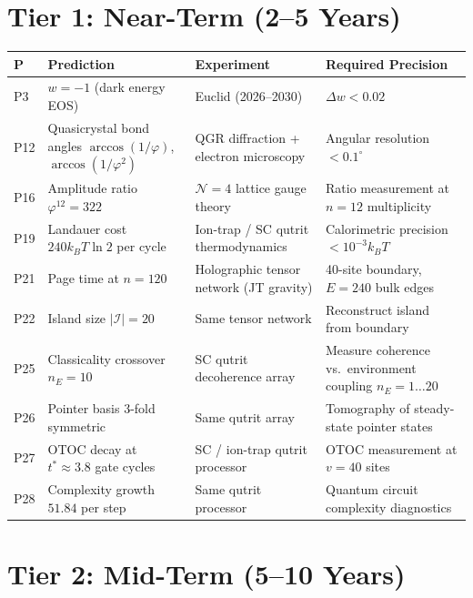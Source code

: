 \section{Tier 1: Near-Term (2--5 Years)}
\label{sec:tier1}

\begin{longtable}{p{0.5cm}p{3.5cm}p{3cm}p{4cm}}
  \hline
  \textbf{P} & \textbf{Prediction} & \textbf{Experiment} &
  \textbf{Required Precision} \\
  \hline
  P3  & $w=-1$ (dark energy EOS) &
        Euclid (2026--2030) & $\Delta w < 0.02$ \\
  P12 & Quasicrystal bond angles
        $\arccos(1/\varphi)$, $\arccos(1/\varphi^2)$ &
        QGR diffraction + electron microscopy &
        Angular resolution $<0.1^\circ$ \\
  P16 & Amplitude ratio $\varphi^{12}=322$ &
        $\mathcal{N}=4$ lattice gauge theory &
        Ratio measurement at $n=12$ multiplicity \\
  P19 & Landauer cost $240k_BT\ln2$ per cycle &
        Ion-trap / SC qutrit thermodynamics &
        Calorimetric precision $<10^{-3}k_BT$ \\
  P21 & Page time at $n=120$ &
        Holographic tensor network (JT gravity) &
        40-site boundary, $E=240$ bulk edges \\
  P22 & Island size $|\mathcal{I}|=20$ &
        Same tensor network & Reconstruct island from boundary \\
  P25 & Classicality crossover $n_E=10$ &
        SC qutrit decoherence array &
        Measure coherence vs.~environment coupling $n_E=1\ldots20$ \\
  P26 & Pointer basis 3-fold symmetric &
        Same qutrit array &
        Tomography of steady-state pointer states \\
  P27 & OTOC decay at $t^*\approx3.8$ gate cycles &
        SC / ion-trap qutrit processor &
        OTOC measurement at $v=40$ sites \\
  P28 & Complexity growth $51.84$ per step &
        Same qutrit processor &
        Quantum circuit complexity diagnostics \\
  \hline
\end{longtable}

\section{Tier 2: Mid-Term (5--10 Years)}
\label{sec:tier2}

